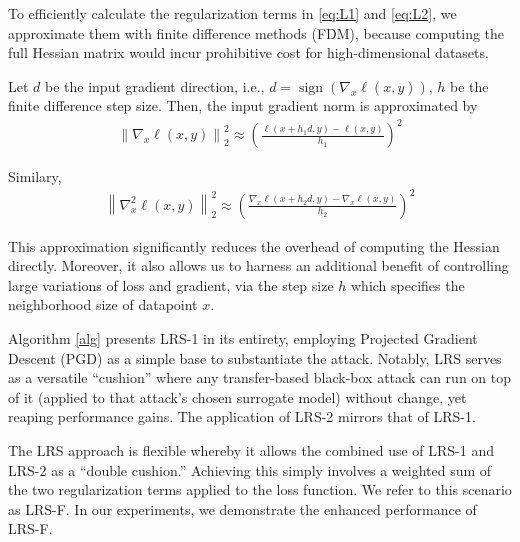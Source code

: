 \documentclass[letterpaper]{article} %
\theoremstyle{plain}
\theoremstyle{definition}
\begin{document}
To efficiently calculate the regularization terms in \eqref{eq:L1} and \eqref{eq:L2}, we approximate them with finite difference methods (FDM), because computing the full Hessian matrix would incur prohibitive cost for high-dimensional datasets.

Let $d$ be the input gradient direction, i.e., $d=\operatorname{sign}(\nabla_x \ell(x, y))$, %
$h$ be the finite difference step size. Then, the input gradient norm is approximated by
\begin{align}
\left\|\nabla_x \ell(x, y)\right\|_2^2 \approx\left(\frac{\ell(x+h_1 d, y)-\ell(x, y)}{h_1}\right)^2
\end{align}

Similary, 
\begin{align}
\left\|\nabla_{x}^{2} \ell(x, y)\right\|_2^2 \approx\left(\frac{\nabla_{x}\ell(x+h_2 d, y)-\nabla_{x}\ell(x, y)}{h_2}\right)^2
\end{align}

This approximation significantly reduces the overhead of computing the Hessian directly. Moreover, it also allows us to harness an additional benefit of controlling large variations of loss and gradient, via the step size $h$ which specifies the neighborhood size of datapoint $x$.

Algorithm \ref{alg} presents LRS-1 in its entirety, employing Projected Gradient Descent (PGD) \cite{madry2018pgd} as a simple base to substantiate the attack. Notably, LRS serves as a versatile ``cushion'' where any transfer-based black-box attack can run on top of it (applied to that attack's chosen surrogate model) without change, yet reaping performance gains. The application of LRS-2 mirrors that of LRS-1.

The LRS approach is flexible whereby it allows the combined use of LRS-1 and LRS-2 as a ``double cushion.'' Achieving this simply involves a weighted sum of the two regularization terms applied to the loss function. We refer to this scenario as LRS-F. In our experiments, we demonstrate the enhanced performance of LRS-F.
\end{document}
